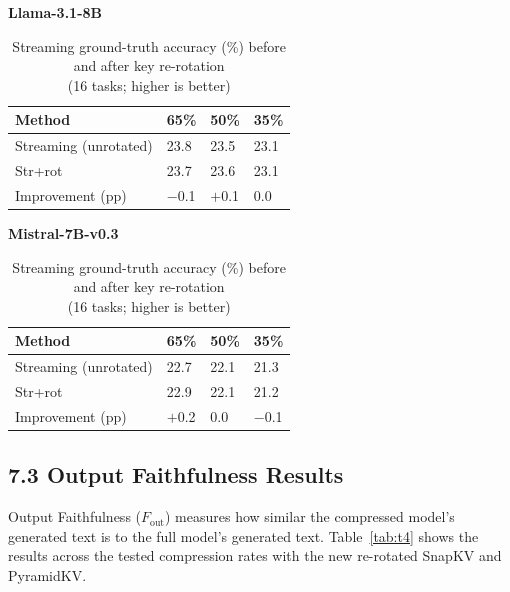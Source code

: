 \documentclass[10pt,letterpaper]{article}
\begin{document}
\begin{table}[H]
\centering
\small
\captionsetup{justification=centering}
\caption{Streaming ground-truth accuracy (\%) before and after key re-rotation\\
(16 tasks; higher is better)}
\label{tab:streaming-gt}
\begin{minipage}[t]{0.49\textwidth}
\centering
\textbf{Llama-3.1-8B}\\[0.4em]
\begin{tabular}{@{}llll@{}}
\toprule
Method & 65\% & 50\% & 35\%\\
\midrule
Streaming (unrotated) & 23.8 & 23.5 & 23.1\\
Str+rot               & 23.7 & 23.6 & 23.1\\
Improvement (pp)      & $-$0.1 & $+$0.1 & 0.0\\
\bottomrule
\end{tabular}
\end{minipage}%
\hfill
\begin{minipage}[t]{0.49\textwidth}
\centering
\textbf{Mistral-7B-v0.3}\\[0.4em]
\begin{tabular}{@{}llll@{}}
\toprule
Method & 65\% & 50\% & 35\%\\
\midrule
Streaming (unrotated) & 22.7 & 22.1 & 21.3\\
Str+rot               & 22.9 & 22.1 & 21.2\\
Improvement (pp)      & $+$0.2 & 0.0 & $-$0.1\\
\bottomrule
\end{tabular}
\end{minipage}
\end{table}

\hypertarget{output-faithfulness-results}{%
\subsection{7.3 Output Faithfulness
Results}\label{output-faithfulness-results}}

Output Faithfulness (\(F_{\text{out}}\)) measures how similar the
compressed model's generated text is to the full model's generated text.  Table~\ref{tab:t4} 
shows the results across the tested compression rates with the new re-rotated SnapKV and PyramidKV.
\end{document}
